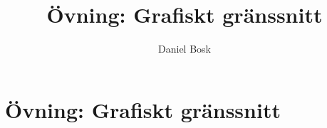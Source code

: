 \documentclass[a4paper,10pt,oneside,openright,
               oldfontcommands]{memoir}
\begin{document}
\title{%
  Övning: Grafiskt gränssnitt
}
\author{Daniel Bosk}

\maketitle

\begin{abstract}
  
\end{abstract}

\clearpage

\tableofcontents*

\chapter{Övning: Grafiskt gränssnitt}



\appendix


\printbibliography
\end{document}
